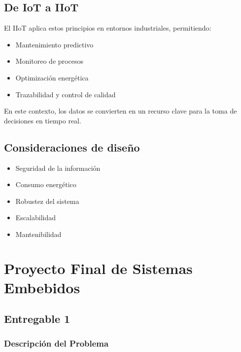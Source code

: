 \documentclass[conference]{IEEEtran}
\begin{document}
\subsection{De IoT a IIoT}

El IIoT aplica estos principios en entornos industriales, permitiendo:

\begin{itemize}
    \item Mantenimiento predictivo
    \item Monitoreo de procesos
    \item Optimización energética
    \item Trazabilidad y control de calidad
\end{itemize}

En este contexto, los datos se convierten en un recurso clave para la toma de decisiones en tiempo real.

\subsection{Consideraciones de diseño}

\begin{itemize}
    \item Seguridad de la información
    \item Consumo energético
    \item Robustez del sistema
    \item Escalabilidad
    \item Mantenibilidad
\end{itemize}

\section{Proyecto Final de Sistemas Embebidos}

\subsection{Entregable 1}

\subsubsection{Descripción del Problema}
\end{document}
